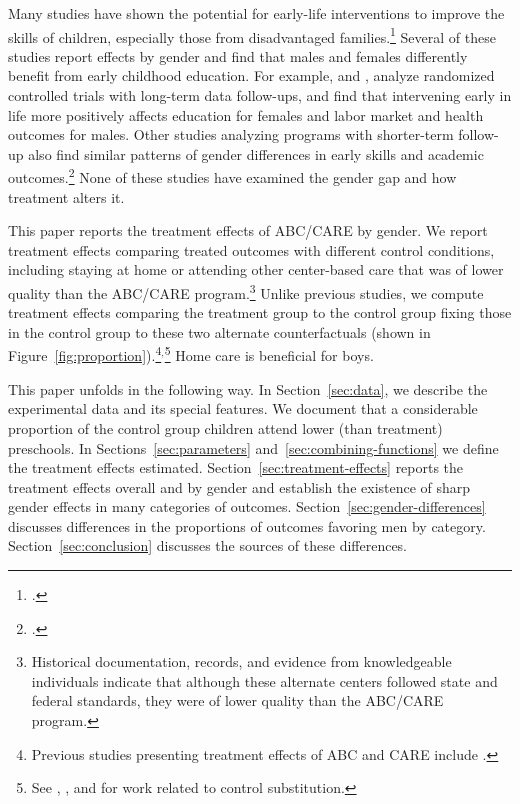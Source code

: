 Many studies have shown the potential for early-life interventions to improve the skills of children, especially those from disadvantaged families.\footnote{\citet{Currie_2011_AER,Elango_Hojman_etal_2016_Early-Edu}.} Several of these studies report effects by gender and find that males and females differently benefit from early childhood education. For example, \citet{Heckman_Moon_etal_2010_QE} and \citet{Garcia_Heckman_Leaf_etal_2017_Comp_CBA_Unpublished}, analyze randomized controlled trials with long-term data follow-ups, and find that intervening early in life more positively affects education for females and labor market and health outcomes for males. Other studies analyzing programs with shorter-term follow-up also find similar patterns of gender differences in early skills and academic outcomes.\footnote{\citet{Deming_2009_AEJAE,Ou_Reynolds_2010_Mechanisms_CYSR,Magnuson_Kelchen_Duncan_etal_2016_ECRQ}.} None of these studies have examined the gender gap and how treatment alters it.

This paper reports the treatment effects of ABC/CARE by gender. We report treatment effects comparing treated outcomes with different control conditions, including staying at home or attending other center-based care that was of lower quality than the ABC/CARE program.\footnote{Historical documentation, records, and evidence from knowledgeable individuals indicate that although these alternate centers followed state and federal standards, they were of lower quality than the ABC/CARE program.} Unlike previous studies, we compute treatment effects comparing the treatment group to the control group fixing those in the control group to these two alternate counterfactuals (shown in Figure~\ref{fig:proportion}).\footnote{Previous studies presenting treatment effects of ABC and CARE include \citet{Ramey_etal_1985_Project-CARE_TiECSE, Clarke_Campbell_1998_ABC_Comparison_ECRQ,Campbell_Pungello_etal_2001_DP,Campbell_Ramey_etal_2002_ADS,Campbell_Wasik_etal_2008_ECRQ,Campbell_Conti_etal_2014_EarlyChildhoodInvestments}.}$^,$\footnote{See \cite{Heckman_1992_randomization}, \cite{Heckman_Hohmann_etal_2000_QJE}, and \cite{Kline_Walters_2016_QJE} for work related to control substitution.} Home care is beneficial for boys. 

This paper unfolds in the following way. In Section~\ref{sec:data}, we describe the experimental data and its special features. We document that a considerable proportion of the control group children attend lower (than treatment) preschools. In Sections~\ref{sec:parameters} and~\ref{sec:combining-functions} we define the treatment effects estimated. Section~\ref{sec:treatment-effects} reports the treatment effects overall and by gender and establish the existence of sharp gender effects in many categories of outcomes. Section~\ref{sec:gender-differences} discusses differences in the proportions of outcomes favoring men by category. Section~\ref{sec:conclusion} discusses the sources of these differences.



